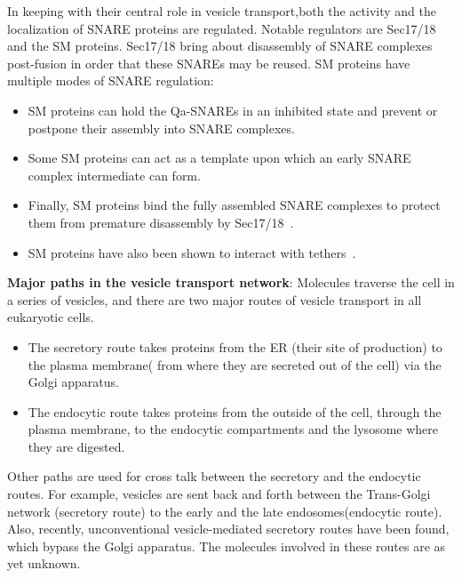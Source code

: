 In keeping with their central role in vesicle transport,both the activity and the localization of SNARE proteins are regulated. Notable regulators are Sec17/18 and the SM proteins.
%
\newline Sec17/18 bring about disassembly of SNARE complexes post-fusion in order that these SNAREs may be reused. 
\newline SM proteins have multiple modes of SNARE regulation: 
\begin{itemize}
	\item SM proteins can hold
	the Qa-SNAREs in an inhibited state and prevent or postpone their assembly into SNARE
	complexes.
	\item Some SM proteins can act as a template upon which an early SNARE complex intermediate can
	form.
	\item Finally, SM proteins bind the fully assembled
	SNARE complexes to protect them from premature disassembly by Sec17/18~\cite{baker2016chaperoning}.
	\item SM proteins have also been shown to interact with tethers~\cite{yoon2018snare}.
\end{itemize}

\textbf{Major paths in the vesicle transport network}:
Molecules traverse the cell in a series of vesicles, and there are two major routes of vesicle transport in all eukaryotic cells.
%
\begin{itemize}
	\item The secretory route takes proteins from the ER (their site of production) to the plasma membrane( from where they are secreted out of the cell) via the Golgi apparatus\cite{alberts2002molecular}.
	\item The endocytic route takes proteins from the outside of the cell, through the plasma membrane, to the endocytic compartments and the lysosome where they are digested. 
\end{itemize}
Other paths are used for cross talk between the secretory and the endocytic routes. For example, vesicles are sent back and forth between the Trans-Golgi network (secretory route) to the early and the late endosomes(endocytic route)\cite{progida2016bidirectional}. Also, recently, unconventional vesicle-mediated secretory routes have been found, which bypass the Golgi apparatus. The molecules involved in these routes are as yet unknown\cite{nickel2018unconventional}. 


